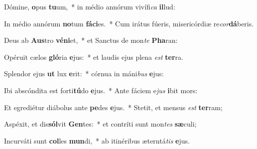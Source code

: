 \item Dómine, \textbf{o}pus \textbf{tu}um,~* in médio annórum vivífi\textit{ca} \textbf{il}lud:
\item In médio annórum \textbf{no}tum \textbf{fá}\textbf{ci}es.~* Cum irátus fúeris, misericórdiæ re\textit{cor}\textbf{dá}beris.
\item Deus ab \textbf{Aus}tro \textbf{vé}\textbf{ni}et,~* et Sanctus de mon\textit{te} \textbf{Pha}ran:
\item Opéruit cælos \textbf{gló}ria \textbf{e}jus:~* et laudis ejus plena \textit{est} \textbf{ter}ra.
\item Splendor ejus \textbf{ut} lux \textbf{e}rit:~* córnua in máni\textit{bus} \textbf{e}jus:
\item Ibi abscóndita est forti\textbf{tú}do \textbf{e}jus.~* Ante fáciem e\textit{jus} \textbf{i}bit mors:
\item Et egrediétur diábolus ante \textbf{pe}des \textbf{e}jus.~* Stetit, et mensus \textit{est} \textbf{ter}ram;
\item Aspéxit, et dis\textbf{sól}vit \textbf{Gen}tes:~* et contríti sunt mon\textit{tes} \textbf{sæ}culi;
\item Incurváti sunt \textbf{col}les \textbf{mun}di,~* ab itinéribus æterntá\textit{tis} \textbf{e}jus.
